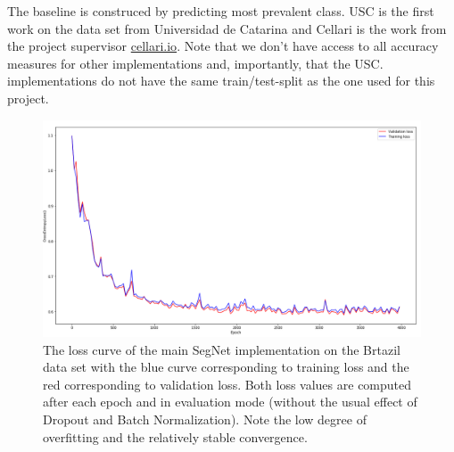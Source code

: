 \documentclass{article}
\begin{document}
The baseline is construced by predicting most prevalent class.
USC is the first work on the data set from Universidad de Catarina \cite{brazil} and Cellari is the work from the project supervisor \url{cellari.io}.
Note that we don't have access to all accuracy measures for other implementations and, importantly, that the USC. implementations do not have the same train/test-split as the one used for this project.
\begin{figure}[!htb]
	\centering
	\includegraphics[width=0.9\linewidth]{../../poster/loss}
	\caption{The loss curve of the main SegNet implementation on the Brtazil data set with the blue curve corresponding to training loss and the red corresponding to validation loss. Both loss values are computed after each epoch and in {evaluation mode} (without the usual effect of Dropout and Batch Normalization). Note the low degree of overfitting and the relatively stable convergence. }
	\label{fig:loss}
\end{figure}




%

%
\end{document}
